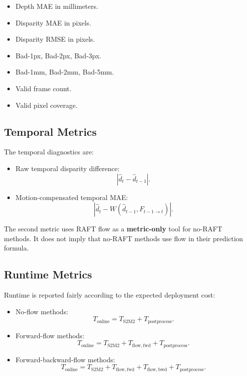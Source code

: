 \documentclass[11pt,a4paper]{article}
\begin{document}
\begin{itemize}[leftmargin=*]
    \item Depth MAE in millimeters.
    \item Disparity MAE in pixels.
    \item Disparity RMSE in pixels.
    \item Bad-1px, Bad-2px, Bad-3px.
    \item Bad-1mm, Bad-2mm, Bad-5mm.
    \item Valid frame count.
    \item Valid pixel coverage.
\end{itemize}

\subsection{Temporal Metrics}

The temporal diagnostics are:

\begin{itemize}[leftmargin=*]
    \item Raw temporal disparity difference:
    \[
        | \hat{d}_t - \hat{d}_{t-1} |.
    \]
    \item Motion-compensated temporal MAE:
    \[
        | \hat{d}_t - W(\hat{d}_{t-1}, F_{t-1\rightarrow t}) |.
    \]
\end{itemize}

The second metric uses RAFT flow as a \textbf{metric-only} tool for no-RAFT methods. It does not imply that no-RAFT methods use flow in their prediction formula.

\subsection{Runtime Metrics}

Runtime is reported fairly according to the expected deployment cost:

\begin{itemize}[leftmargin=*]
    \item No-flow methods:
    \[
        T_{\mathrm{online}} = T_{\mathrm{S2M2}} + T_{\mathrm{postprocess}}.
    \]
    \item Forward-flow methods:
    \[
        T_{\mathrm{online}} = T_{\mathrm{S2M2}} + T_{\mathrm{flow,fwd}} + T_{\mathrm{postprocess}}.
    \]
    \item Forward-backward-flow methods:
    \[
        T_{\mathrm{online}} = T_{\mathrm{S2M2}} + T_{\mathrm{flow,fwd}} + T_{\mathrm{flow,bwd}} + T_{\mathrm{postprocess}}.
    \]
\end{itemize}
\end{document}
